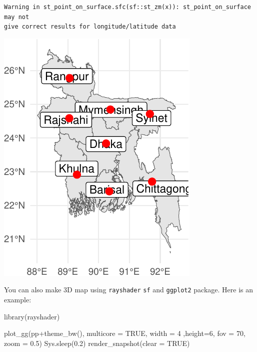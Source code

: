 \documentclass[
  letterpaper,
  DIV=11,
  numbers=noendperiod]{scrreprt}
\newenvironment{Shaded}{\begin{snugshade}}{\end{snugshade}}
\newcommand{\AttributeTok}[1]{\textcolor[rgb]{0.40,0.45,0.13}{#1}}
\newcommand{\ConstantTok}[1]{\textcolor[rgb]{0.56,0.35,0.01}{#1}}
\newcommand{\DecValTok}[1]{\textcolor[rgb]{0.68,0.00,0.00}{#1}}
\newcommand{\FloatTok}[1]{\textcolor[rgb]{0.68,0.00,0.00}{#1}}
\newcommand{\FunctionTok}[1]{\textcolor[rgb]{0.28,0.35,0.67}{#1}}
\newcommand{\NormalTok}[1]{\textcolor[rgb]{0.00,0.23,0.31}{#1}}
\newcommand{\SpecialCharTok}[1]{\textcolor[rgb]{0.37,0.37,0.37}{#1}}
\begin{document}
\begin{verbatim}
Warning in st_point_on_surface.sfc(sf::st_zm(x)): st_point_on_surface may not
give correct results for longitude/latitude data
\end{verbatim}

\includegraphics{ch20_files/figure-pdf/unnamed-chunk-2-1.pdf}

You can also make 3D map using \texttt{rayshader} \texttt{sf} and
\texttt{ggplot2} package. Here is an example:

\begin{Shaded}
\begin{Highlighting}[]
\FunctionTok{library}\NormalTok{(rayshader)}

\FunctionTok{plot\_gg}\NormalTok{(pp}\SpecialCharTok{+}\FunctionTok{theme\_bw}\NormalTok{(), }\AttributeTok{multicore =} \ConstantTok{TRUE}\NormalTok{, }\AttributeTok{width =} \DecValTok{4}\NormalTok{ ,}\AttributeTok{height=}\DecValTok{6}\NormalTok{, }\AttributeTok{fov =} \DecValTok{70}\NormalTok{, }\AttributeTok{zoom =} \FloatTok{0.5}\NormalTok{)}
\FunctionTok{Sys.sleep}\NormalTok{(}\FloatTok{0.2}\NormalTok{)}
\FunctionTok{render\_snapshot}\NormalTok{(}\AttributeTok{clear =} \ConstantTok{TRUE}\NormalTok{)}
\end{Highlighting}
\end{Shaded}
\end{document}
